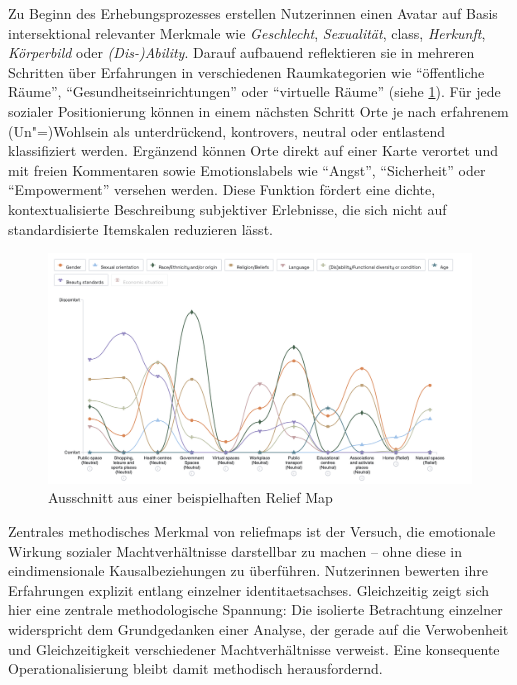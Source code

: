 Zu Beginn des Erhebungsprozesses erstellen Nutzer\genderstern innen einen Avatar auf Basis intersektional relevanter Merkmale wie \emph{Geschlecht}, \emph{Sexualität}, \gls{class}, \emph{Herkunft}, \emph{Körperbild} oder \emph{(Dis-)Ability}. Darauf aufbauend reflektieren sie in mehreren Schritten über Erfahrungen in verschiedenen Raumkategorien wie \enquote{öffentliche Räume}, \enquote{Gesundheitseinrichtungen} oder \enquote{virtuelle Räume} (siehe \cref{fig:relief_maps_plus_screenshot_1}). Für jede  sozialer Positionierung können in einem nächsten Schritt Orte je nach erfahrenem (Un\nobreakdash"=)Wohlsein als unterdrückend, kontrovers, neutral oder entlastend klassifiziert werden. Ergänzend können Orte direkt auf einer Karte verortet und mit freien Kommentaren sowie Emotionslabels wie \enquote{Angst}, \enquote{Sicherheit} oder \enquote{Empowerment} versehen werden. Diese Funktion fördert eine dichte, kontextualisierte Beschreibung subjektiver Erlebnisse, die sich nicht auf standardisierte Itemskalen reduzieren lässt.

\begin{figure}[htbp]
    \centering
    \includegraphics[width=\textwidth]{Arbeit/Bilder/reliefmap.png}
    \caption{Ausschnitt aus einer beispielhaften Relief Map}
    \label{fig:relief_maps_plus_screenshot_1}
\end{figure}

Zentrales methodisches Merkmal von \gls{reliefmaps} ist der Versuch, die emotionale Wirkung sozialer Machtverhältnisse darstellbar zu machen -- ohne diese in eindimensionale Kausalbeziehungen zu überführen. Nutzer\genderstern innen bewerten ihre Erfahrungen explizit entlang einzelner \glspl{identitaetsachse}. Gleichzeitig zeigt sich hier eine zentrale methodologische Spannung: Die isolierte Betrachtung einzelner  widerspricht dem Grundgedanken einer  Analyse, der gerade auf die Verwobenheit und Gleichzeitigkeit verschiedener Machtverhältnisse verweist. Eine konsequente  Operationalisierung bleibt damit methodisch herausfordernd.

